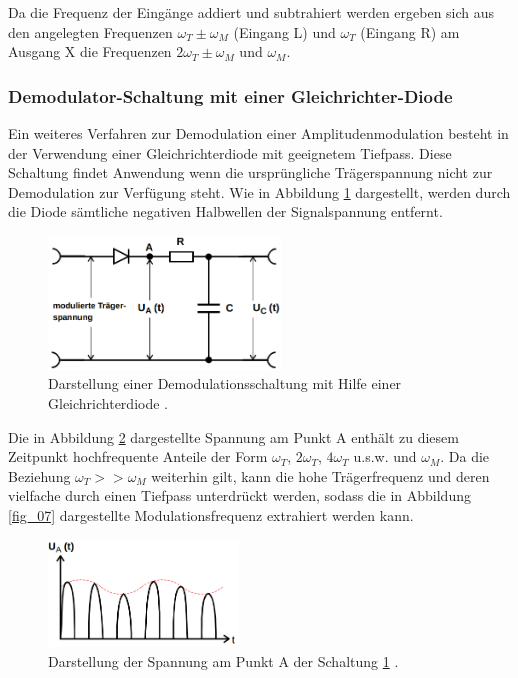 Da die Frequenz der Eingänge addiert und subtrahiert werden ergeben sich aus den angelegten Frequenzen $\omega_T\pm\omega_M$ (Eingang L) und $\omega_T$ (Eingang R) am Ausgang X die Frequenzen $2\omega_T\pm\omega_M$ und $\omega_M$.

\subsubsection{Demodulator-Schaltung mit einer Gleichrichter-Diode}
\label{DSmeGD}
Ein weiteres Verfahren zur Demodulation einer Amplitudenmodulation besteht in der Verwendung einer Gleichrichterdiode mit geeignetem Tiefpass. Diese Schaltung findet Anwendung wenn die ursprüngliche Trägerspannung nicht zur Demodulation zur Verfügung steht. Wie in Abbildung \ref{fig_05} dargestellt, werden durch die Diode sämtliche negativen Halbwellen der Signalspannung entfernt.

\begin{figure}
    \centering
    \includegraphics[width=0.55\textwidth]{ressources/A5.png}
    \caption{Darstellung einer Demodulationsschaltung mit Hilfe einer Gleichrichterdiode \cite{skript}.}
    \label{fig_05}
\end{figure}

Die in Abbildung \ref{fig_06} dargestellte Spannung am Punkt A enthält zu diesem Zeitpunkt hochfrequente Anteile der Form $\omega_T$, $2\omega_T$, $4\omega_T$ u.s.w. und $\omega_M$. Da die Beziehung $\omega_T>>\omega_M$ weiterhin gilt, kann die hohe Trägerfrequenz und deren vielfache durch einen Tiefpass unterdrückt werden, sodass die in Abbildung \ref{fig_07} dargestellte Modulationsfrequenz extrahiert werden kann. 

\begin{figure}
    \centering
    \includegraphics[width=0.45\textwidth]{ressources/A6.png}
    \caption{Darstellung der Spannung am Punkt A der Schaltung \ref{fig_05} \cite{skript}.}
    \label{fig_06}
\end{figure}

